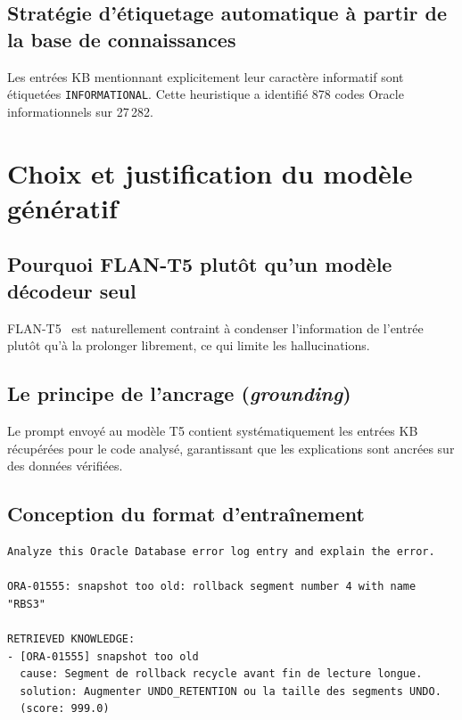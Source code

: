 \documentclass[12pt,a4paper]{report}
\begin{document}
\subsection{Strat\'egie d'\'etiquetage automatique \`a partir de la base de connaissances}

Les entr\'ees KB mentionnant explicitement leur caract\`ere informatif sont
\'etiquet\'ees \texttt{INFORMATIONAL}. Cette heuristique a identifi\'e 878 codes
Oracle informationnels sur 27\,282.

\section{Choix et justification du mod\`ele g\'en\'eratif}

\subsection{Pourquoi FLAN-T5 plut\^ot qu'un mod\`ele d\'ecodeur seul}

FLAN-T5~\cite{flanT5} est naturellement contraint \`a condenser l'information de
l'entr\'ee plut\^ot qu'\`a la prolonger librement, ce qui limite les hallucinations.

\subsection{Le principe de l'ancrage (\emph{grounding})}

Le prompt envoy\'e au mod\`ele T5 contient syst\'ematiquement les entr\'ees KB
r\'ecup\'er\'ees pour le code analys\'e, garantissant que les explications sont
ancr\'ees sur des donn\'ees v\'erifi\'ees.

\subsection{Conception du format d'entra\^inement}

\begin{lstlisting}[language={},caption={Format d'entr\'ee du mod\`ele T5},label=lst:t5_format]
Analyze this Oracle Database error log entry and explain the error.

ORA-01555: snapshot too old: rollback segment number 4 with name "RBS3"

RETRIEVED KNOWLEDGE:
- [ORA-01555] snapshot too old
  cause: Segment de rollback recycle avant fin de lecture longue.
  solution: Augmenter UNDO_RETENTION ou la taille des segments UNDO.
  (score: 999.0)
\end{lstlisting}
\end{document}
